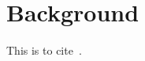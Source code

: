 \label{chap:introduction}

\section{Background}\label{sec:background}

This is to cite~\cite{Brydson1999}.

